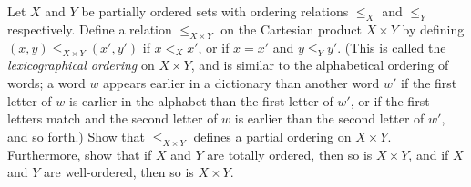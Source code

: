 \begin{exercise}\label{ex 8.5.12}
    Let \(X\) and \(Y\) be partially ordered sets with ordering relations \(\leq_X\) and \(\leq_Y\) respectively.
    Define a relation \(\leq_{X \times Y}\) on the Cartesian product \(X \times Y\) by defining \((x, y) \leq_{X \times Y} (x', y')\) if \(x <_X x'\), or if \(x = x'\) and \(y \leq_Y y'\).
    (This is called the \emph{lexicographical ordering} on \(X \times Y\), and is similar to the alphabetical ordering of words;
    a word \(w\) appears earlier in a dictionary than another word \(w'\) if the first letter of \(w\) is earlier in the alphabet than the first letter of \(w'\), or if the first letters match and the second letter of \(w\) is earlier than the second letter of \(w'\), and so forth.)
    Show that \(\leq_{X \times Y}\) defines a partial ordering on \(X \times Y\).
    Furthermore, show that if \(X\) and \(Y\) are totally ordered, then so is \(X \times Y\), and if \(X\) and \(Y\) are well-ordered, then so is \(X \times Y\).
\end{exercise}


